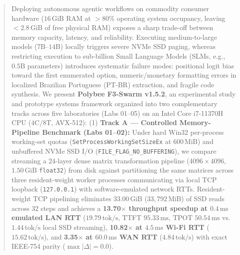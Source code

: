 \documentclass[10pt,a4paper]{article}
\begin{document}
\begin{abstract}
\noindent Deploying autonomous agentic workflows on commodity consumer hardware ($16\,\text{GiB}$ RAM at $>80\%$ operating system occupancy, leaving $<2.8\,\text{GiB}$ of free physical RAM) exposes a sharp trade-off between memory capacity, latency, and reliability. Executing medium-to-large models ($7\text{B}\text{--}14\text{B}$) locally triggers severe NVMe SSD paging, whereas restricting execution to sub-billion Small Language Models (SLMs, e.g., $0.5\text{B}$ parameters) introduces systematic failure modes: positional logit bias toward the first enumerated option, numeric/monetary formatting errors in localized Brazilian Portuguese (PT-BR) extraction, and fragile code synthesis. We present \textbf{Polybee F3-Swarm v1.5.2}, an experimental study and prototype systems framework organized into two complementary tracks across five laboratories (Labs 01--05) on an Intel Core i7-11370H CPU ($4\text{C}/8\text{T}$, AVX-512):
(1) \textbf{Track A — Controlled Memory-Pipeline Benchmark (Labs 01--02):} Under hard Win32 per-process working-set quotas (\texttt{SetProcessWorkingSetSizeEx} at $600\,\text{MiB}$) and unbuffered NVMe SSD I/O (\texttt{FILE\_FLAG\_NO\_BUFFERING}), we compare streaming a 24-layer dense matrix transformation pipeline ($4096 \times 4096$, $1.50\,\text{GiB}$ \texttt{float32}) from disk against partitioning the same matrices across three resident-weight worker processes communicating via local TCP loopback (\texttt{127.0.0.1}) with software-emulated network RTTs. Resident-weight TCP pipelining eliminates $33.00\,\text{GiB}$ ($33,792\,\text{MiB}$) of SSD reads across $32$ steps and achieves a \textbf{13.70$\times$ throughput speedup at $0.4\,\text{ms}$ emulated LAN RTT} ($19.79\,\text{tok/s}$, TTFT $95.33\,\text{ms}$, TPOT $50.54\,\text{ms}$ vs.\ $1.44\,\text{tok/s}$ local SSD streaming), \textbf{10.82$\times$ at $4.5\,\text{ms}$ Wi-Fi RTT} ($15.62\,\text{tok/s}$), and \textbf{3.35$\times$ at $60.0\,\text{ms}$ WAN RTT} ($4.84\,\text{tok/s}$) with exact IEEE-754 parity ($\max|\Delta|=0.0$).

\end{abstract}
\end{document}
